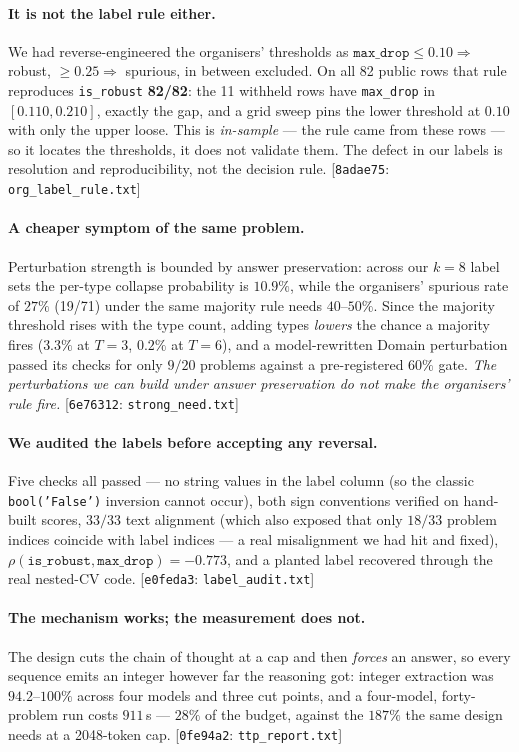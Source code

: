 \documentclass[10pt]{article}
\newcommand{\cmt}[2]{{\footnotesize\textsf{[}\texttt{#1}\textsf{:} #2\textsf{]}}}
\begin{document}
\paragraph{It is not the label rule either.} We had reverse-engineered the organisers' thresholds as
$\texttt{max\_drop} \le 0.10 \Rightarrow$ robust, $\ge 0.25 \Rightarrow$ spurious, in between
excluded. On all 82 public rows that rule reproduces \texttt{is\_robust} \textbf{82/82}: the 11
withheld rows have \texttt{max\_drop} in $[0.110, 0.210]$, exactly the gap, and a grid sweep pins
the lower threshold at $0.10$ with only the upper loose. This is \emph{in-sample} --- the rule came
from these rows --- so it locates the thresholds, it does not validate them. The defect in our
labels is resolution and reproducibility, not the decision rule.
\cmt{8adae75}{\texttt{org\_label\_rule.txt}}

\paragraph{A cheaper symptom of the same problem.} Perturbation strength is bounded by
answer preservation: across our $k{=}8$ label sets the per-type collapse probability is $10.9\%$,
while the organisers' spurious rate of $27\%$ (19/71) under the same majority rule needs
$40$--$50\%$. Since the majority threshold rises with the type count, adding types \emph{lowers} the
chance a majority fires ($3.3\%$ at $T{=}3$, $0.2\%$ at $T{=}6$), and a model-rewritten Domain
perturbation passed its checks for only $9/20$ problems against a pre-registered $60\%$ gate.
\emph{The perturbations we can build under answer preservation do not make the organisers' rule
fire.} \cmt{6e76312}{\texttt{strong\_need.txt}}

\paragraph{We audited the labels before accepting any reversal.} Five checks all passed --- no
string values in the label column (so the classic \texttt{bool('False')} inversion cannot occur),
both sign conventions verified on hand-built scores, $33/33$ text alignment (which also exposed that
only $18/33$ problem indices coincide with label indices --- a real misalignment we had hit and
fixed), $\rho(\texttt{is\_robust}, \texttt{max\_drop}) = -0.773$, and a planted label recovered
through the real nested-CV code. \cmt{e0feda3}{\texttt{label\_audit.txt}}

\paragraph{The mechanism works; the measurement does not.} The design cuts the chain of thought at
a cap and then \emph{forces} an answer, so every sequence emits an integer however far the reasoning
got: integer extraction was $94.2$--$100\%$ across four models and three cut points, and a
four-model, forty-problem run costs $911$\,s --- $28\%$ of the budget, against the $187\%$ the same
design needs at a 2048-token cap. \cmt{0fe94a2}{\texttt{ttp\_report.txt}}
\end{document}
